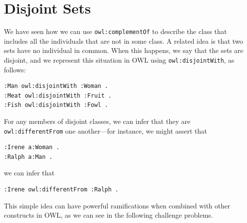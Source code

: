 \section{Disjoint Sets}

We have seen how we can use \texttt{owl:complementOf} to describe the class that
includes all the individuals that are not in some class. A related idea
is that two sets have no individual in common. When this happens, we say
that the sets are disjoint, and we represent this situation in OWL using
\texttt{owl:disjointWith}, as follows:

\begin{lstlisting}
:Man owl:disjointWith :Woman .
:Meat owl:disjointWith :Fruit .
:Fish owl:disjointWith :Fowl .
\end{lstlisting}

For any members of disjoint classes, we can infer that they are
\texttt{owl:differentFrom} one another---for instance, we might assert that

\begin{lstlisting}
:Irene a:Woman .
:Ralph a:Man .
\end{lstlisting}

we can infer that

\begin{lstlisting}
:Irene owl:differentFrom :Ralph .
\end{lstlisting}

This simple idea can have powerful ramifications when combined with
other constructs in OWL, as we can see in the following challenge
problems.


